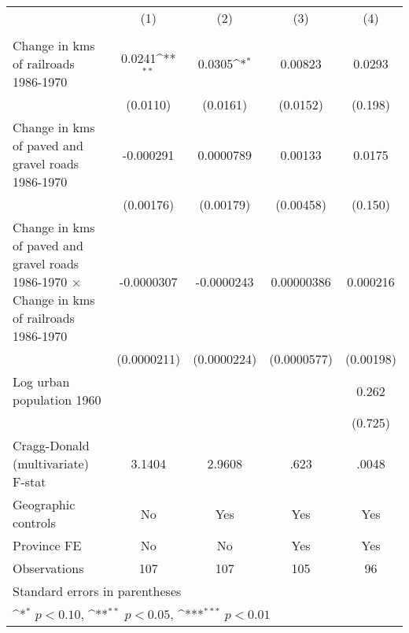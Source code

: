 {
\def\sym#1{\ifmmode^{#1}\else\(^{#1}\)\fi}
\begin{tabular}{l*{4}{c}}
\hline\hline
                &\multicolumn{1}{c}{(1)}&\multicolumn{1}{c}{(2)}&\multicolumn{1}{c}{(3)}&\multicolumn{1}{c}{(4)}\\
                &\multicolumn{1}{c}{}&\multicolumn{1}{c}{}&\multicolumn{1}{c}{}&\multicolumn{1}{c}{}\\
\hline
Change in kms of railroads 1986-1970&   0.0241\sym{**} &   0.0305\sym{*}  &  0.00823         &   0.0293         \\
                & (0.0110)         & (0.0161)         & (0.0152)         &  (0.198)         \\
[1em]
Change in kms of paved and gravel roads 1986-1970&-0.000291         &0.0000789         &  0.00133         &   0.0175         \\
                &(0.00176)         &(0.00179)         &(0.00458)         &  (0.150)         \\
[1em]
Change in kms of paved and gravel roads 1986-1970 $\times$ Change in kms of railroads 1986-1970&-0.0000307         &-0.0000243         &0.00000386         & 0.000216         \\
                &(0.0000211)         &(0.0000224)         &(0.0000577)         &(0.00198)         \\
[1em]
Log urban population 1960&                  &                  &                  &    0.262         \\
                &                  &                  &                  &  (0.725)         \\
\hline
Cragg-Donald (multivariate) F-stat&   3.1404         &   2.9608         &     .623         &    .0048         \\
Geographic controls&       No         &      Yes         &      Yes         &      Yes         \\
Province FE     &       No         &       No         &      Yes         &      Yes         \\
Observations    &      107         &      107         &      105         &       96         \\
\hline\hline
\multicolumn{5}{l}{\footnotesize Standard errors in parentheses}\\
\multicolumn{5}{l}{\footnotesize \sym{*} \(p<0.10\), \sym{**} \(p<0.05\), \sym{***} \(p<0.01\)}\\
\end{tabular}
}
